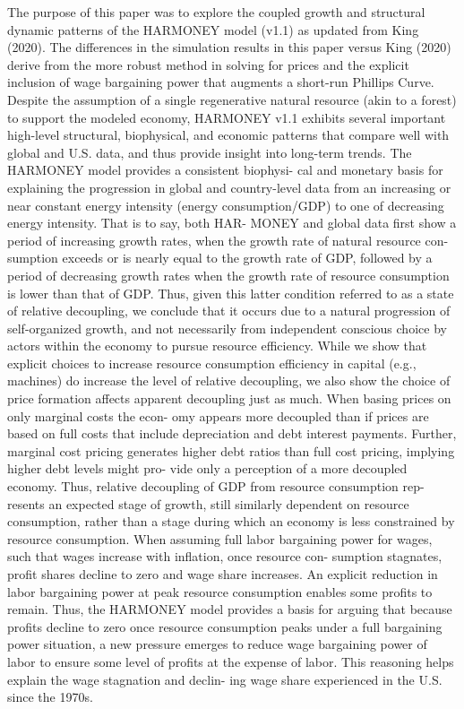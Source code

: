 \documentclass[
]{book}
\begin{document}
The purpose of this paper was to explore the coupled growth
and structural dynamic patterns of the HARMONEY model
(v1.1) as updated from King (2020). The differences in the
simulation results in this paper versus King (2020) derive
from the more robust method in solving for prices and the
explicit inclusion of wage bargaining power that augments a
short-run Phillips Curve. Despite the assumption of a single
regenerative natural resource (akin to a forest) to support
the modeled economy, HARMONEY v1.1 exhibits several
important high-level structural, biophysical, and economic
patterns that compare well with global and U.S. data, and
thus provide insight into long-term trends.
The HARMONEY model provides a consistent biophysi-
cal and monetary basis for explaining the progression in
global and country-level data from an increasing or near
constant energy intensity (energy consumption/GDP) to one
of decreasing energy intensity. That is to say, both HAR-
MONEY and global data first show a period of increasing
growth rates, when the growth rate of natural resource con-
sumption exceeds or is nearly equal to the growth rate of
GDP, followed by a period of decreasing growth rates when
the growth rate of resource consumption is lower than that
of GDP. Thus, given this latter condition referred to as a
state of relative decoupling, we conclude that it occurs due
to a natural progression of self-organized growth, and not
necessarily from independent conscious choice by actors
within the economy to pursue resource efficiency.
While we show that explicit choices to increase resource
consumption efficiency in capital (e.g., machines) do
increase the level of relative decoupling, we also show the
choice of price formation affects apparent decoupling just as
much. When basing prices on only marginal costs the econ-
omy appears more decoupled than if prices are based on full
costs that include depreciation and debt interest payments.
Further, marginal cost pricing generates higher debt ratios
than full cost pricing, implying higher debt levels might pro-
vide only a perception of a more decoupled economy. Thus,
relative decoupling of GDP from resource consumption rep-
resents an expected stage of growth, still similarly dependent
on resource consumption, rather than a stage during which
an economy is less constrained by resource consumption.
When assuming full labor bargaining power for wages,
such that wages increase with inflation, once resource con-
sumption stagnates, profit shares decline to zero and wage
share increases. An explicit reduction in labor bargaining
power at peak resource consumption enables some profits
to remain. Thus, the HARMONEY model provides a basis
for arguing that because profits decline to zero once resource
consumption peaks under a full bargaining power situation,
a new pressure emerges to reduce wage bargaining power of
labor to ensure some level of profits at the expense of labor.
This reasoning helps explain the wage stagnation and declin-
ing wage share experienced in the U.S. since the 1970s.
\end{document}

